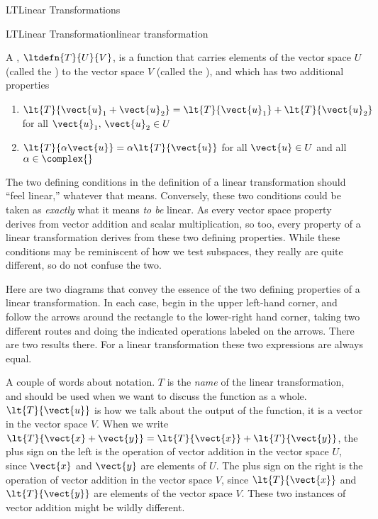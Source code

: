 \begin{subsect}{LT}{Linear Transformations}
%
\begin{definition}{LT}{Linear Transformation}{linear transformation}
\begin{para}A , $\ltdefn{T}{U}{V}$, is a function that carries elements of the vector space $U$ (called the ) to the vector space $V$ (called the ), and which has two additional properties
%
\begin{enumerate}
\item $\lt{T}{\vect{u}_1+\vect{u}_2}=\lt{T}{\vect{u}_1}+\lt{T}{\vect{u}_2}$ for all $\vect{u}_1,\,\vect{u}_2\in U$
\item $\lt{T}{\alpha\vect{u}}=\alpha\lt{T}{\vect{u}}$ for all $\vect{u}\in U$ and all $\alpha\in\complex{\null}$
\end{enumerate}
\end{para}
%
\end{definition}
%
\begin{para}The two defining conditions in the definition of a linear transformation should ``feel linear,'' whatever that means.  Conversely, these two conditions could be taken as {\em exactly} what it means {\em to be} linear.  As every vector space property derives from vector addition and scalar multiplication, so too, every property of a linear transformation derives from these two defining properties.  While these conditions may be reminiscent of how we test subspaces, they really are quite different, so do not confuse the two.\end{para}
%
\begin{para}Here are two diagrams that convey the essence of the two defining properties of a linear transformation.  In each case, begin in the upper left-hand corner, and follow the arrows around the rectangle to the lower-right hand corner, taking two different routes and doing the indicated operations labeled on the arrows.  There are two results there.  For a linear transformation these two expressions are always equal.
%
%
\end{para}
%
\begin{para}A couple of words about notation.  $T$ is the {\em name} of the linear transformation, and should be used when we want to discuss the function as a whole.  $\lt{T}{\vect{u}}$ is how we talk about the output of the function, it is a vector in the vector space $V$.  When we write $\lt{T}{\vect{x}+\vect{y}}=\lt{T}{\vect{x}}+\lt{T}{\vect{y}}$, the plus sign on the left is the operation of vector addition in the vector space $U$, since $\vect{x}$ and $\vect{y}$ are elements of $U$.  The plus sign on the right is the operation of vector addition in the vector space $V$, since $\lt{T}{\vect{x}}$ and $\lt{T}{\vect{y}}$ are elements of the vector space $V$.  These two instances of vector addition might be wildly different.\end{para}

\end{subsect}

